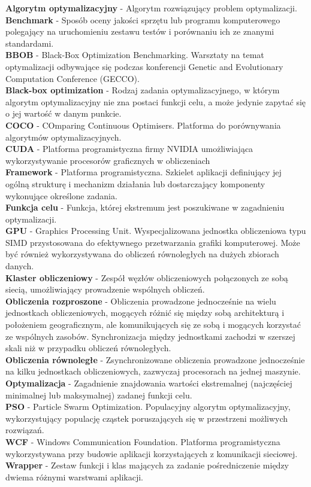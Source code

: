 \documentclass[12pt, twoside, openany, abstract=on]{report}
\theoremstyle{definition}
\begin{document}
\textbf{Algorytm optymalizacyjny} - Algorytm rozwiązujący problem optymalizacji.\\
\textbf{Benchmark} - Sposób oceny jakości sprzętu lub programu komputerowego polegający na uruchomieniu zestawu testów i porównaniu ich ze znanymi standardami.\\
\textbf{BBOB} - Black-Box Optimization Benchmarking. Warsztaty na temat optymalizacji odbywające się podczas konferencji Genetic and Evolutionary Computation Conference (GECCO).\\
\textbf{Black-box optimization} - Rodzaj zadania optymalizacyjnego, w którym algorytm optymalizacyjny nie zna postaci funkcji celu, a może jedynie zapytać się o jej wartość w danym punkcie.\\
\textbf{COCO} - COmparing Continuous Optimisers. Platforma do porównywania algorytmów optymalizacyjnych.\\
\textbf{CUDA} - Platforma programistyczna firmy NVIDIA umożliwiająca wykorzystywanie procesorów graficznych w obliczeniach\\
\textbf{Framework} - Platforma programistyczna. Szkielet aplikacji definiujący jej ogólną strukturę i mechanizm działania lub dostarczający komponenty wykonujące określone zadania.\\
\textbf{Funkcja celu} - Funkcja, której ekstremum jest poszukiwane w zagadnieniu optymalizacji.\\
\textbf{GPU} - Graphics Processing Unit. Wyspecjalizowana jednostka obliczeniowa typu SIMD przystosowana do efektywnego przetwarzania grafiki komputerowej. Może być również wykorzystywana do obliczeń równoległych na dużych zbiorach danych.\\
\textbf{Klaster obliczeniowy} - Zespół węzłów obliczeniowych połączonych ze sobą siecią, umożliwiający prowadzenie wspólnych obliczeń.\\
\textbf{Obliczenia rozproszone} - Obliczenia prowadzone jednocześnie na wielu jednostkach obliczeniowych, mogących różnić się między sobą architekturą i położeniem geograficznym, ale komunikujących się ze sobą i mogących korzystać ze wspólnych zasobów. Synchronizacja między jednostkami zachodzi w szerszej skali niż w przypadku obliczeń równoległych.\\
\textbf{Obliczenia równoległe} - Zsynchronizowane obliczenia prowadzone jednocześnie na kilku jednostkach obliczeniowych, zazwyczaj procesorach na jednej maszynie.\\
\textbf{Optymalizacja} - Zagadnienie znajdowania wartości ekstremalnej (najczęściej minimalnej lub maksymalnej) zadanej funkcji celu.\\
\textbf{PSO} - Particle Swarm Optimization. Populacyjny algorytm optymalizacyjny, wykorzystujący populację cząstek poruszających się w przestrzeni możliwych rozwiązań.\\
\textbf{WCF} - Windows Communication Foundation. Platforma programistyczna wykorzystywana przy budowie aplikacji korzystających z komunikacji sieciowej.\\
\textbf{Wrapper} - Zestaw funkcji i klas mających za zadanie pośredniczenie między dwiema różnymi warstwami aplikacji.\\
\end{document}

